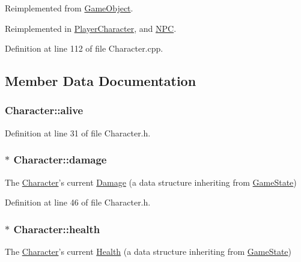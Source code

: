 Reimplemented from \hyperlink{class_game_object_adc249c683994a9c74b518a82fc22dbab}{Game\-Object}.



Reimplemented in \hyperlink{class_player_character_aac83579c2f552973e71008c1b1e01b1d}{Player\-Character}, and \hyperlink{class_n_p_c_ad85699c2a35f1f5f9d5a81a3d5df2153}{N\-P\-C}.



Definition at line 112 of file Character.\-cpp.



\subsection{Member Data Documentation}
\hypertarget{class_character_ac83b99be690bb41b7fae53e9457838c6}{
\subsubsection[{alive}]{ Character\-::alive\hspace{0.3cm}{\ttfamily [protected]}}}\label{class_character_ac83b99be690bb41b7fae53e9457838c6}


Definition at line 31 of file Character.\-h.

\hypertarget{class_character_ae6a140637ffe5004179d90a0e04a411b}{
\subsubsection[{damage}]{$\ast$ Character\-::damage\hspace{0.3cm}{\ttfamily [protected]}}}\label{class_character_ae6a140637ffe5004179d90a0e04a411b}
The \hyperlink{class_character}{Character}'s current \hyperlink{struct_damage}{Damage} (a data structure inheriting from \hyperlink{struct_game_state}{Game\-State}) 

Definition at line 46 of file Character.\-h.

\hypertarget{class_character_ae8c0d82624dc3a171e2c3b42c699151e}{
\subsubsection[{health}]{$\ast$ Character\-::health\hspace{0.3cm}{\ttfamily [protected]}}}\label{class_character_ae8c0d82624dc3a171e2c3b42c699151e}
The \hyperlink{class_character}{Character}'s current \hyperlink{struct_health}{Health} (a data structure inheriting from \hyperlink{struct_game_state}{Game\-State}) 

